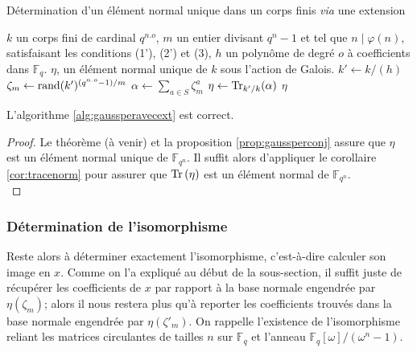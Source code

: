 \documentclass[a4paper]{article} %
\numberwithin{section}{part}
\numberwithin{equation}{section}
\newcommand\GF[1]{\mathbb{F}_{#1}}
\newcommand\Tr[1]{\textup{Tr}\left(#1\right)}
\begin{document}
\begin{algorithm}
\caption{Détermination d'un élément normal unique dans un corps finis
\textit{via} une extension}
\label{alg:gaussperavecext}
\begin{algorithmic}[1]
\REQUIRE $k$ un corps fini de cardinal $q^{n.o}$, $m$ un entier divisant $q^n -
1$ et tel que $n\mid\varphi(n)$, satisfaisant les conditions (1'), (2') et (3), 
$h$ un polynôme de degré $o$ à coefficients dans $\GF{q}$.
\ENSURE $\eta$, un élément normal unique de $k$ sous l'action de Galois.
\bigskip
\STATE $k' \leftarrow k/(h)$
\REPEAT
    \STATE $\zeta_m \leftarrow \textup{rand}(k')^{(q^{n.o} - 1)/m}$
\STATE $\alpha \leftarrow \sum_{a\in S}{\zeta_m^a}$
\STATE $\eta \leftarrow \textup{Tr}_{k'/k}(\alpha)$
\RETURN $\eta$
\end{algorithmic}
\end{algorithm}

\begin{prop} 
L'algorithme \ref{alg:gaussperavecext} est correct.
\end{prop}
\begin{proof}
Le théorème (à venir) et la proposition \ref{prop:gaussperconj} assure que
$\eta$ est un élément normal unique de $\GF{q^{n}}$. Il suffit alors
d'appliquer le corollaire \ref{cor:tracenorm} pour assurer que $\Tr{\eta}$ est
un élément normal de $\GF{q^n}$.\\
\end{proof}

\subsubsection*{Détermination de l'isomorphisme}
Reste alors à déterminer exactement l'isomorphisme, c'est-à-dire calculer son
image en $x$. Comme on l'a expliqué au début de la sous-section, il suffit juste
de récupérer les coefficients de $x$ par rapport à la base normale engendrée par
$\eta(\zeta_m)$; alors il nous restera plus qu'à reporter les coefficients 
trouvés dans la base normale engendrée par $\eta(\zeta'_m)$. On rappelle
l'existence de l'isomorphisme reliant les matrices circulantes de tailles $n$ 
sur $\GF{q}$ et l'anneau $\GF{q}[\omega]/(\omega^n - 1)$.
\end{document}
